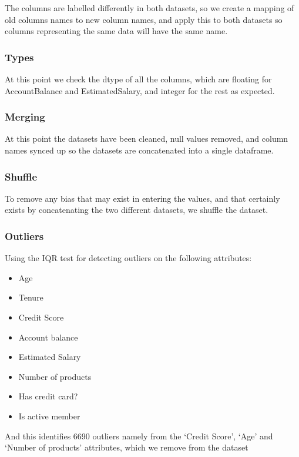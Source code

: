 \documentclass[]{article}
\begin{document}
The columns are labelled differently in both datasets, so we create a mapping of old columns names to new column names, and apply this to both datasets so columns representing the same data will have the same name.

\subsubsection{Types}

At this point we check the dtype of all the columns, which are floating for AccountBalance and EstimatedSalary, and integer for the rest as expected.

\subsubsection{Merging}

At this point the datasets have been cleaned, null values removed, and column names synced up so the datasets are concatenated into a single dataframe.

\subsubsection{Shuffle}

To remove any bias that may exist in entering the values, and that certainly exists by concatenating the two different datasets, we shuffle the dataset.

\subsubsection{Outliers}

Using the IQR test for detecting outliers on the following attributes:

\begin{itemize}
	\item Age
	\item Tenure
	\item Credit Score
	\item Account balance
	\item Estimated Salary
	\item Number of products
	\item Has credit card?
	\item Is active member
\end{itemize}

And this identifies 6690 outliers namely from the ‘Credit Score’, ‘Age’ and ‘Number of products’ attributes, which we remove from the dataset
\end{document}
